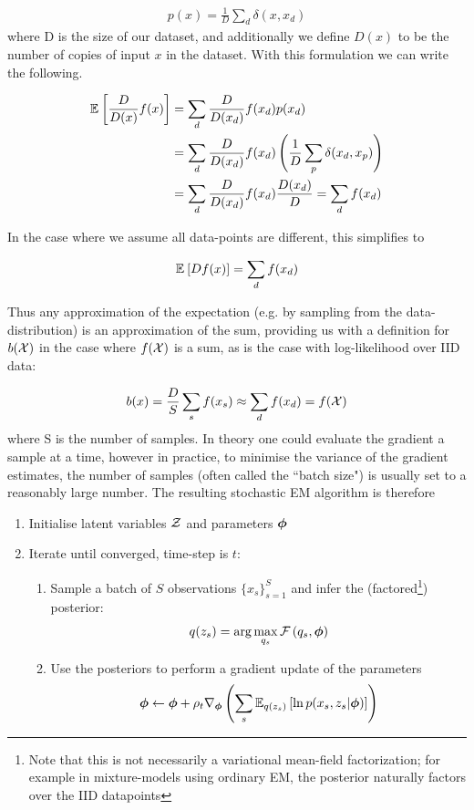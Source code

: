 \begin{align*}
p(x) = \frac{1}{D} \sum_d \delta(x, x_d)
\end{align*}
where D is the size of our dataset, and additionally we define $D(x)$ to be the number of copies of input $x$ in the dataset. With this formulation we can write the following.

\begin{align*}
\ex{\frac{D}{D(x)} f(x)}{}
& = \sum_d \frac{D}{D(x_d)} f(x_d) p(x_d) \\
& = \sum_d \frac{D}{D(x_d)} f(x_d) \left(\frac{1}{D} \sum_p \delta(x_d, x_p)\right) \\ 
& = \sum_d \frac{D}{D(x_d)} f(x_d) \frac{D(x_d)}{D} = \sum_d f(x_d)
\end{align*}

In the case where we assume all data-points are different, this simplifies to

\begin{align*}
\ex{D f(x)}{} = \sum_d f(x_d)
\end{align*}

Thus any approximation of the expectation (e.g. by sampling from the data-distribution) is an approximation of the sum, providing us with a definition for $b(\xdat)$ in the case where $f(\xdat)$ is a sum, as is the case with log-likelihood over IID data:

\begin{align*}
b(x) = \frac{D}{S} \sum_s f(x_s) \approx \sum_d f(x_d) = f(\xdat)
\end{align*}
where S is the number of samples. In theory one could evaluate the gradient a sample at a time, however in practice, to minimise the variance of the gradient estimates, the number of samples (often called the ``batch size") is usually set to a reasonably large number. The resulting stochastic EM algorithm is therefore

\begin{enumerate}
    \item Initialise latent variables $\zdat$ and parameters $\param$
    \item Iterate until converged, time-step is $t$:
    \begin{enumerate}
        \item Sample a batch of $S$ observations $\{ x_s \}_{s=1}^S$ and infer the (factored\footnote{Note that this is not necessarily a variational mean-field factorization; for example in mixture-models using ordinary EM, the posterior naturally factors over the IID datapoints}) posterior:
        \begin{align*}
            q(z_s) = \arg \max_{q_s} \fqt{q_s, \param}
        \end{align*}
        \item Use the posteriors to perform a gradient update of the parameters
        \begin{align*}
        \param \leftarrow \param + \rho_t \nabla_\param \left(\sum_s \ex{\ln p(x_s, z_s|\param)}{q(z_s)}\right)
        \end{align*}
        \end{enumerate}
\end{enumerate}

